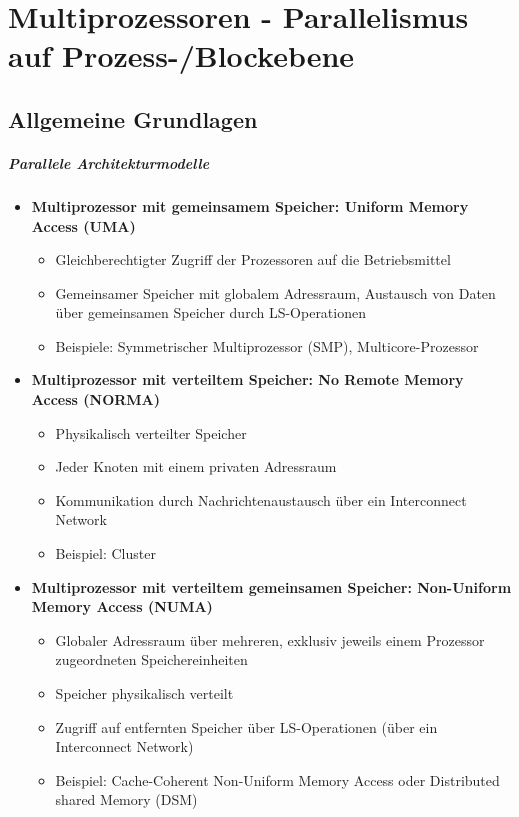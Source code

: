 
\chapter{Multiprozessoren - Parallelismus auf Prozess-/Blockebene}

\section{Allgemeine Grundlagen}
	\paragraph{Parallele Architekturmodelle}
		\begin{itemize}
			\item \textbf{Multiprozessor mit gemeinsamem Speicher: Uniform Memory Access (UMA)}
			\begin{itemize}
				\item Gleichberechtigter Zugriff der Prozessoren auf die Betriebsmittel
				\item Gemeinsamer Speicher mit globalem Adressraum, Austausch von Daten über gemeinsamen Speicher durch LS-Operationen
				\item Beispiele: Symmetrischer Multiprozessor (SMP), Multicore-Prozessor
			\end{itemize}
			\item \textbf{Multiprozessor mit verteiltem Speicher: No Remote Memory Access (NORMA)}
			\begin{itemize}
				\item Physikalisch verteilter Speicher
				\item Jeder Knoten mit einem privaten Adressraum
				\item Kommunikation durch Nachrichtenaustausch über ein Interconnect Network
				\item Beispiel: Cluster
			\end{itemize}
			\item \textbf{Multiprozessor mit verteiltem gemeinsamen Speicher: Non-Uniform Memory Access (NUMA)}
			\begin{itemize}
				\item Globaler Adressraum über mehreren, exklusiv jeweils einem Prozessor zugeordneten Speichereinheiten
				\item Speicher physikalisch verteilt
				\item Zugriff auf entfernten Speicher über LS-Operationen (über ein Interconnect Network)
				\item Beispiel: Cache-Coherent Non-Uniform Memory Access oder Distributed shared Memory (DSM)
			\end{itemize}
		\end{itemize}

